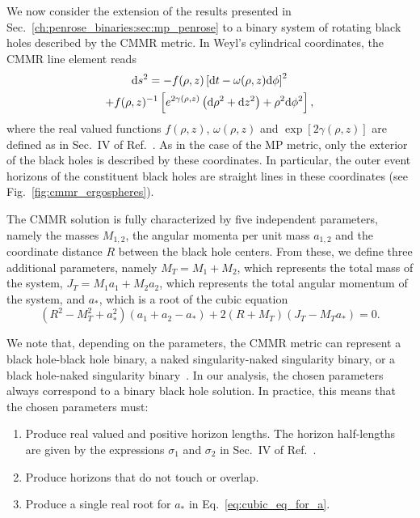 We now consider the extension of the results presented in Sec.~\ref{ch:penrose_binaries:sec:mp_penrose} to a binary system of rotating black holes described by the CMMR metric. In Weyl's cylindrical coordinates, the CMMR line element reads
%
\begin{multline}
  \mathrm{d} s^2 = -f(\rho,z)\left[\mathrm{d} t - \omega(\rho,z)\mathrm{d}\phi\right]^2 \\
  + f(\rho,z)^{-1}\left[e^{2\gamma(\rho,z)}\left(\mathrm{d} \rho^2 + \mathrm{d} z^2\right) + \rho^2\mathrm{d}\phi^2\right],
  \label{eq:cmmr_line_element}
\end{multline}
%
where the real valued functions $f(\rho,z)$, $\omega(\rho,z)$ and $\exp[2\gamma(\rho,z)]$ are defined as in Sec.~IV of Ref.~\cite{manko_ruiz_thermo}. As in the case of the MP metric, only the exterior of the black holes is described by these coordinates. In particular, the outer event horizons of the constituent black holes are straight lines in these coordinates (see Fig.~\ref{fig:cmmr_ergospheres}).

The CMMR solution is fully characterized by five independent parameters, namely the masses $M_{1,2}$, the angular momenta per unit mass $a_{1,2}$ and the coordinate distance $R$ between the black hole centers. From these, we define three additional parameters, namely $M_T = M_1 + M_2$, which represents the total mass of the system, $J_T = M_1 a_1 + M_2 a_2$, which represents the total angular momentum of the system, and $a_*$, which is a root of the cubic equation
%
\begin{equation}
  \left(R^2 - M_T^2 + a_*^2\right) \left(a_1 + a_2 - a_*\right) + 2 \left(R + M_T \right)\left(J_T - M_T a_* \right) = 0.
  \label{eq:cubic_eq_for_a}
\end{equation}

We note that, depending on the parameters, the CMMR metric can represent a black hole-black hole binary, a naked singularity-naked singularity binary, or a black hole-naked singularity binary~\cite{cabrera_metric,manko_ruiz_metric, manko_ruiz_thermo}. In our analysis, the chosen parameters always correspond to a binary black hole solution. In practice, this means that the chosen parameters must:
%
\begin{enumerate}
  \item Produce real valued and positive horizon lengths. The horizon half-lengths are given by the expressions $\sigma_1$ and $\sigma_2$ in Sec.~IV of Ref.~\cite{manko_ruiz_thermo}.
  \item Produce horizons that do not touch or overlap.
  \item Produce a single real root for $a_*$ in Eq.~\eqref{eq:cubic_eq_for_a}.
\end{enumerate}

